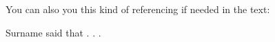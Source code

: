You can also you this kind of referencing if needed in the text: 

Surname \citeyearpar{mybookchapter} said that . . .

 		











